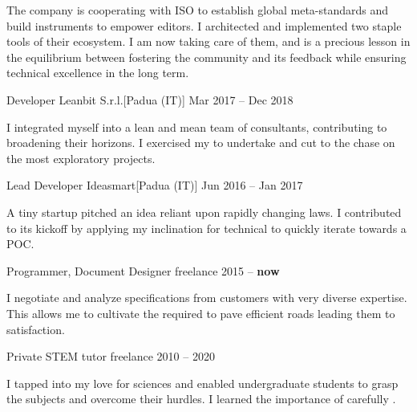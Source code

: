 \documentclass[9pt]{scrartcl}
\def\Phi{1.618}
\newlength{\Pad}\setlength{\Pad}{14.562pt} %
\begin{document}
The company is cooperating with ISO to establish global meta-standards and build
instruments to empower editors. I architected and implemented two staple
 tools of their ecosystem.
%
I am now taking care of them, and  is a precious lesson in
the equilibrium between fostering the community and its feedback while ensuring
technical excellence in the long term.

\smallskip

\Event
  {Developer}
  {Leanbit S.r.l.}[Padua (IT)]
  {Mar 2017 -- Dec 2018}

I integrated myself into a lean and mean team of consultants, contributing to
broadening their horizons. I exercised my  to undertake and
cut to the chase on the most exploratory projects.

\smallskip

\Event
  {Lead Developer}
  {Ideasmart}[Padua (IT)]
  {Jun 2016 -- Jan 2017}

A tiny startup pitched an idea reliant upon rapidly changing laws.
I contributed to its kickoff by applying my inclination for technical 
to quickly iterate towards a POC.

\smallskip

\Event
  {Programmer, Document Designer}
  {freelance}
  {2015 -- \textbf{now}}

I negotiate and analyze specifications from customers with very diverse
expertise. This allows me to cultivate the  required
to pave efficient roads leading them to satisfaction.

\smallskip

\Event
  {Private STEM tutor}
  {freelance}
  {2010 -- 2020}

I tapped into my love for sciences and enabled undergraduate students to grasp
the subjects and overcome their hurdles. I learned the importance of carefully
.


\end{document}
